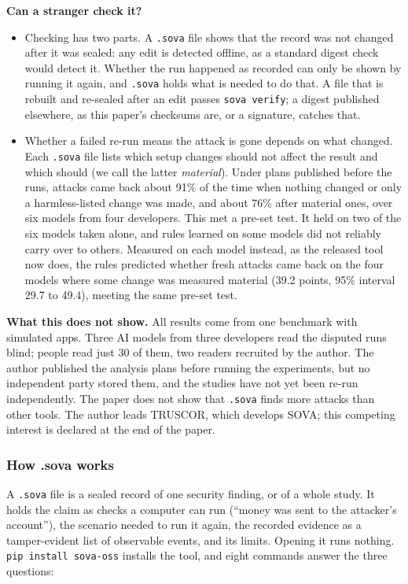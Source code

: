 \documentclass[
  american,
  10pt,
  a4paper,
]{article}
\providecommand{\tightlist}{%
  \setlength{\itemsep}{0pt}\setlength{\parskip}{0pt}}
\begin{document}
\textbf{Can a stranger check it?}

\begin{itemize}
\tightlist
\item
  Checking has two parts. A \texttt{.sova} file shows that the record
  was not changed after it was sealed: any edit is detected offline, as
  a standard digest check would detect it. Whether the run happened as
  recorded can only be shown by running it again, and \texttt{.sova}
  holds what is needed to do that. A file that is rebuilt and re-sealed
  after an edit passes \texttt{sova\ verify}; a digest published
  elsewhere, as this paper's checksums are, or a signature, catches
  that.
\item
  Whether a failed re-run means the attack is gone depends on what
  changed. Each \texttt{.sova} file lists which setup changes should not
  affect the result and which should (we call the latter
  \emph{material}). Under plans published before the runs, attacks came
  back about 91\% of the time when nothing changed or only a
  harmless-listed change was made, and about 76\% after material ones,
  over six models from four developers. This met a pre-set test. It held
  on two of the six models taken alone, and rules learned on some models
  did not reliably carry over to others. Measured on each model instead,
  as the released tool now does, the rules predicted whether fresh
  attacks came back on the four models where some change was measured
  material (39.2 points, 95\% interval 29.7 to 49.4), meeting the same
  pre-set test.
\end{itemize}

\textbf{What this does not show.} All results come from one benchmark
with simulated apps. Three AI models from three developers read the
disputed runs blind; people read just 30 of them, two readers recruited
by the author. The author published the analysis plans before running
the experiments, but no independent party stored them, and the studies
have not yet been re-run independently. The paper does not show that
\texttt{.sova} finds more attacks than other tools. The author leads
TRUSCOR, which develops SOVA; this competing interest is declared at the
end of the paper.

\subsubsection{How .sova works}\label{how-.sova-works}

A \texttt{.sova} file is a sealed record of one security finding, or of
a whole study. It holds the claim as checks a computer can run (``money
was sent to the attacker's account''), the scenario needed to run it
again, the recorded evidence as a tamper-evident list of observable
events, and its limits. Opening it runs nothing.
\texttt{pip\ install\ sova-oss} installs the tool, and eight commands
answer the three questions:
\end{document}
